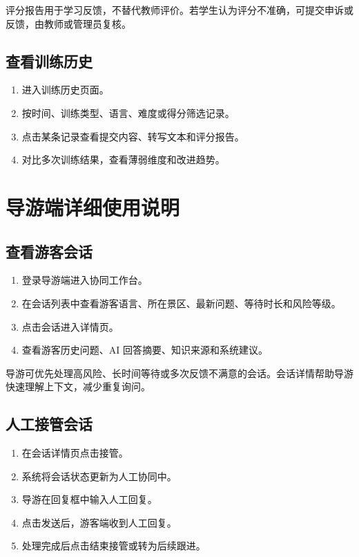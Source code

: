 评分报告用于学习反馈，不替代教师评价。若学生认为评分不准确，可提交申诉或反馈，由教师或管理员复核。


\subsection{查看训练历史}

\begin{enumerate}[leftmargin=2em]
  \item 进入训练历史页面。
  \item 按时间、训练类型、语言、难度或得分筛选记录。
  \item 点击某条记录查看提交内容、转写文本和评分报告。
  \item 对比多次训练结果，查看薄弱维度和改进趋势。
\end{enumerate}


\section{导游端详细使用说明}

\subsection{查看游客会话}

\begin{enumerate}[leftmargin=2em]
  \item 登录导游端进入协同工作台。
  \item 在会话列表中查看游客语言、所在景区、最新问题、等待时长和风险等级。
  \item 点击会话进入详情页。
  \item 查看游客历史问题、AI 回答摘要、知识来源和系统建议。
\end{enumerate}

导游可优先处理高风险、长时间等待或多次反馈不满意的会话。会话详情帮助导游快速理解上下文，减少重复询问。


\subsection{人工接管会话}

\begin{enumerate}[leftmargin=2em]
  \item 在会话详情页点击接管。
  \item 系统将会话状态更新为人工协同中。
  \item 导游在回复框中输入人工回复。
  \item 点击发送后，游客端收到人工回复。
  \item 处理完成后点击结束接管或转为后续跟进。
\end{enumerate}

